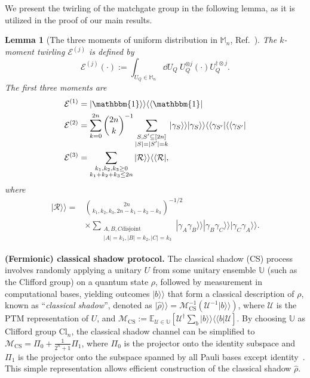 \documentclass[showpacs,twocolumn,aps,prx,long bibliography,superscriptaddress,notitlepage]{revtex4-1}
\newtheorem{lemma}{Lemma}
\newcommand{\supket}[1]{|#1 \rangle\rangle}
\newcommand{\supbra}[1]{\langle\langle #1 |}
\newcommand{\sbra}[1]{\left[ #1 \right]}
\newcommand{\Ecal}{\mathcal{E}}
\newcommand{\Rcal}{\mathcal{R}}
\newcommand{\Ucal}{\mathcal{U}}
\newcommand{\Mcal}{\mathcal{M}}
\newcommand{\Ubb}{\mathbb{U}}
\newcommand{\Mbb}{\mathbb{M}}
\newcommand{\Ebb}{\mathbb{E}}
\begin{document}
We present the twirling of the matchgate group in the following lemma, as it is utilized in the proof of our main results.
\begin{lemma}[The three moments of uniform distribution in $\Mbb_n$, Ref.~\cite{wan2022matchgate}]
\label{lemma: 1}
The $k$-moment twirling $\Ecal^{(j)}$ is defined by
\begin{equation}
    \Ecal^{(j)}(\cdot):=\int_{U_Q \in \Mbb_n} \dd U_Q ~ U_Q^{\otimes j} (\cdot ) U_Q ^{\dagger \otimes j}.
\end{equation}
The first three moments are
\begin{equation}
    \begin{aligned}
        \Ecal^{(1)} &= \supket{\mathbbm{1}}\supbra{\mathbbm{1}} \\
        \Ecal^{(2)} &= \sum_{k=0}^{2n} {2n\choose k}^{-1}\sum_{\substack{S,S'\subseteq [2n] \\ |S| = |S'| = k}} \supket{\gamma_S}\supket{\gamma_S}\supbra{\gamma_{S'}}\supbra{\gamma_{S'}} \\
        \Ecal^{(3)} &= \sum_{
\substack{ k_1,k_2,k_3 \geq 0 \\ k_1 + k_2+k_3\leq 2n }}\supket{\Rcal}\supbra{\Rcal} ,
    \end{aligned}
\end{equation}
where 
\begin{align}
    \supket{\Rcal}=&{2n \choose k_1,k_2,k_3, 2n - k_1-k_2-k_3}^{-1/2}  \nonumber\\ 
    &\times \sum_{\substack{A,B,C \text{disjoint}\\
|A|=k_1,|B|=k_2, |C| = k_3
}
}\supket{\gamma_{A} \gamma_{B}}\supket{\gamma_{B} \gamma_{C}} \supket{\gamma_{C} \gamma_{A}}.
\end{align}

\label{lem:FCS_shadow_channel}
\end{lemma}


 \vspace{8pt}
\noindent\textbf{(Fermionic) classical shadow protocol.} The classical shadow (CS) process involves randomly applying a unitary $U$ from some unitary ensemble $\Ubb$ (such as the Clifford group) on a quantum state $\rho$, followed by measurement in computational bases, yielding outcomes $\supket{b}$ that form a classical description of $\rho$, known as ``\emph{classical shadow}'', denoted as $\supket{\hat{\rho}} = \mathcal{M}^{-1}_{\text{CS}}(\Ucal^{-1}\supket{b})$, where $\Ucal$ is the PTM representation of $U$, and $\mathcal{M}_{\text{CS}}:=\Ebb_{\Ucal\in\Ubb}\sbra{\Ucal^{\dagger}\sum_{b} \supket{b}\supbra{b} \Ucal}$. By choosing $\Ubb$ as Clifford group Cl$_n$, the classical shadow channel can be simplified to $\Mcal_{\text{CS}} = \Pi_0 + \frac{1}{2^n + 1}\Pi_1$, where $\Pi_0$ is the projector onto the identity subspace and $\Pi_1$ is the projector onto the subspace spanned by all Pauli bases except identity~\cite{huang2020predicting, chen2021robust}. This simple representation allows efficient construction of the classical shadow $\hat{\rho}$.
\end{document}

